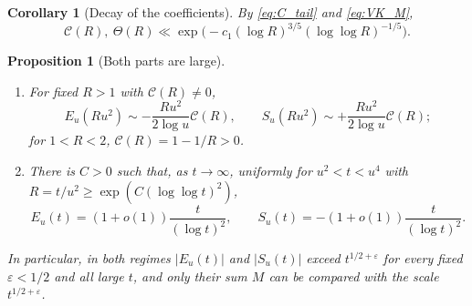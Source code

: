 \documentclass[11pt]{amsart}
\numberwithin{equation}{section}
\theoremstyle{plain}
\newtheorem{proposition}[theorem]{Proposition}
\newtheorem{corollary}[theorem]{Corollary}
\theoremstyle{definition}
\theoremstyle{remark}
\newcommand{\eps}{\varepsilon}
\newcommand{\Cc}{\mathcal{C}}
\begin{document}
\begin{corollary}[Decay of the coefficients]
\label{cor:AR-VK}
By \eqref{eq:C_tail} and \eqref{eq:VK_M},
\begin{equation}
\label{eq:AR-VK}
  \Cc(R),\ \Theta(R)\ll\exp\bigl(-c_1(\log R)^{3/5}(\log\log R)^{-1/5}\bigr).
\end{equation}
\end{corollary}

\begin{proposition}[Both parts are large]
\label{prop:both_parts_large}
\begin{enumerate}[label=\textup{(\roman*)}]
\item For fixed $R>1$ with $\Cc(R)\ne0$,
\begin{equation}
\label{eq:E_fixed_R_size}
  E_u(Ru^2)\sim-\frac{Ru^2}{2\log u}\Cc(R),\qquad
  S_u(Ru^2)\sim+\frac{Ru^2}{2\log u}\Cc(R);
\end{equation}
for $1<R<2$, $\Cc(R)=1-1/R>0$.
\item There is $C>0$ such that, as $t\to\infty$, uniformly for $u^2<t<u^4$
with $R=t/u^2\ge\exp(C(\log\log t)^2)$,
\begin{equation}
\label{eq:E_log2}
  E_u(t)=(1+o(1))\frac{t}{(\log t)^2},\qquad
  S_u(t)=-(1+o(1))\frac{t}{(\log t)^2}.
\end{equation}
\end{enumerate}
In particular, in both regimes $|E_u(t)|$ and $|S_u(t)|$ exceed
$t^{1/2+\eps}$ for every fixed $\eps<1/2$ and all large $t$, and only their
sum $M$ can be compared with the scale $t^{1/2+\eps}$.
\end{proposition}
\end{document}
